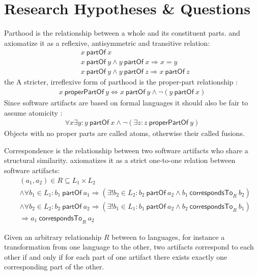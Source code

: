 \documentclass[runningheads,a4paper]{llncs}
\newcommand{\partOf}{~\textsf{partOf}~}
\newcommand{\properPartOf}{~\textsf{properPartOf}~}
\newcommand{\correspondsToR}[1]{~\textsf{correspondsTo}_{#1}~}
\begin{document}
\section{Research Hypotheses \& Questions}
\label{section:ResearchHypthesesAndQuestions}
Parthood is the relationship between a whole and its constituent parts.
\cite{DBLP:journals/dke/Varzi96} and \cite{DBLP:conf/sle/Lammel16} axiomatize it as a reflexive, antisymmetric and transitive relation:
\begin{align*}
&x \partOf x
\\&x \partOf y \wedge y \partOf x \Rightarrow x = y
\\&x \partOf y \wedge y \partOf z \Rightarrow x \partOf z
\end{align*}the
A stricter, irreflexive form of parthood is the proper-part relationship \cite{DBLP:journals/dke/Varzi96}:
\begin{align*}
x \properPartOf y
\Leftrightarrow
x \partOf y \wedge \neg(y \partOf x)
\end{align*}
Since software artifacts are based on formal languages it should also be fair to assume atomicity \cite{DBLP:journals/dke/Varzi96}:
\begin{align*}
\forall x \exists y : 
y \partOf x \wedge \neg(\exists z : z \properPartOf y)
\end{align*}
Objects with no proper parts are called atoms, otherwise their called fusions.

Correspondence is the relationship between two software artifacts who share a structural similarity.
\cite{DBLP:conf/sle/Lammel16} axiomatizes it as a strict one-to-one relation between software artifacts:
\begin{align*}
&(a_1,a_2) \in R \subseteq L_1 \times L_2
\\&\wedge \forall b_1 \in L_1 : b_1 \partOf a_1 \Rightarrow (\exists! b_2 \in L_2 : b_2 \partOf a_2 \wedge b_1 \correspondsToR{R} b_2 )
\\&\wedge \forall b_2 \in L_2 : b_2 \partOf a_2 \Rightarrow (\exists! b_1 \in L_1 : b_1 \partOf a_2 \wedge b_2 \correspondsToR{R} b_1 )
\\&\Rightarrow a_1 \correspondsToR{R} a_2
\end{align*}

Given an arbitrary relationship $R$ between to languages, for instance a transformation from one language to the other, two artifacts correspond to each other if and only if for each part of one artifact there exists exactly one corresponding part of the other.
\end{document}
